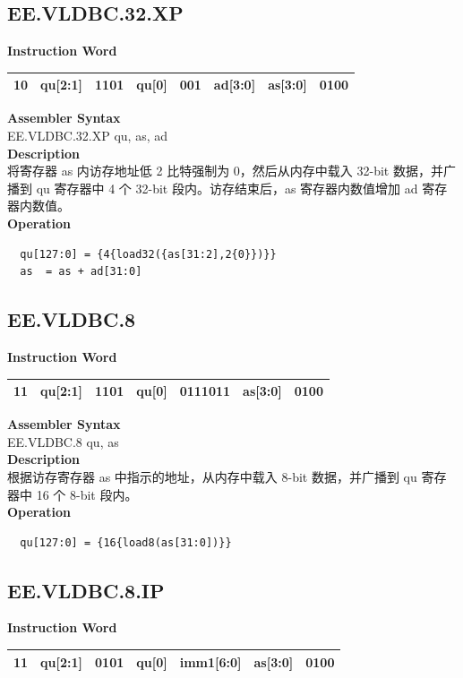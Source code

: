\clearpage
\subsection{EE.VLDBC.32.XP}\label{instruction:EEVLDBC32XP}
\setlength\tabcolsep{6pt}
\textbf{Instruction Word} \\
\begin{tabular}{|c|c|c|c|c|c|c|c|}
	\hline
	10 & qu[2:1] & 1101 & qu[0] & 001 & ad[3:0] & as[3:0] & 0100 \\
	\hline
\end{tabular}

\textbf{Assembler Syntax} \\
EE.VLDBC.32.XP qu, as, ad \\
\textbf{Description} \\
将寄存器 as 内访存地址低 2 比特强制为 0，然后从内存中载入 32-bit 数据，并广播到 qu 寄存器中 4 个 32-bit 段内。访存结束后，as 寄存器内数值增加 ad 寄存器内数值。\\
\textbf{Operation}
\begin{lstlisting}
  qu[127:0] = {4{load32({as[31:2],2{0}})}}
  as  = as + ad[31:0]
\end{lstlisting}

\clearpage
\subsection{EE.VLDBC.8}\label{instruction:EEVLDBC8}
\setlength\tabcolsep{6pt}
\textbf{Instruction Word} \\
\begin{tabular}{|c|c|c|c|c|c|c|}
	\hline
	11 & qu[2:1] & 1101 & qu[0] & 0111011 & as[3:0] & 0100 \\
	\hline
\end{tabular}

\textbf{Assembler Syntax} \\
EE.VLDBC.8 qu, as \\
\textbf{Description} \\
根据访存寄存器 as 中指示的地址，从内存中载入 8-bit 数据，并广播到 qu 寄存器中 16 个 8-bit 段内。\\
\textbf{Operation}
\begin{lstlisting}
  qu[127:0] = {16{load8(as[31:0])}}
\end{lstlisting}

\clearpage
\subsection{EE.VLDBC.8.IP}\label{instruction:EEVLDBC8IP}
\setlength\tabcolsep{6pt}
\textbf{Instruction Word} \\
\begin{tabular}{|c|c|c|c|c|c|c|}
	\hline
	11 & qu[2:1] & 0101 & qu[0] & imm1[6:0] & as[3:0] & 0100 \\
	\hline
\end{tabular}

